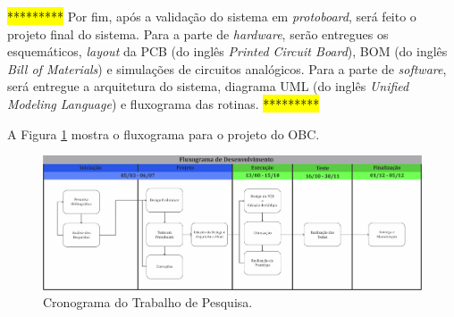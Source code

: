 \hl{*********}
Por fim, após a validação do sistema em \textit{protoboard}, será feito o  projeto final do sistema. Para a parte de \textit{hardware}, serão entregues os esquemáticos, \textit{layout} da PCB (do inglês \textit{Printed Circuit Board}), BOM (do inglês \textit{Bill of Materials}) e simulações de circuitos analógicos. Para a parte de \textit{software}, será entregue a arquitetura do sistema, diagrama UML (do inglês \textit{Unified Modeling Language}) e fluxograma das rotinas.
\hl{*********}

A Figura \ref{fig01} mostra o fluxograma para o projeto do OBC.

\begin{figure}[!h]
	\centerfloat
	\centering
	\includegraphics[keepaspectratio=true,scale=0.54	]{figuras/cronograma_2.jpg}
	\caption{Cronograma do Trabalho de Pesquisa.}
	\label{fig01}
\end{figure}

